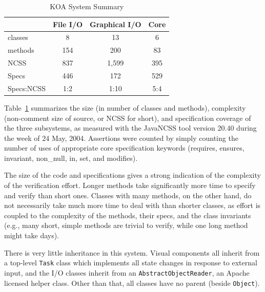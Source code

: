 \documentclass{llncs}
\begin{document}
\begin{table}[htbp]
  \caption{KOA System Summary}
  \label{tab:KOA_System_Summary}
  \begin{center}
    \begin{tabular}{|l|ccc|}
      \hline
      \quad     & \textbf{File I/O} & \textbf{Graphical I/O} & \textbf{Core} \\
      \hline
       classes & 8                 & 13                     & 6             \\
       methods & 154               & 200                    & 83            \\
      NCSS      & 837               & 1,599                  & 395           \\
      Specs     & 446               & 172                    & 529           \\
      Specs:NCSS & 1:2              & 1:10                   & 5:4           \\
      \hline
    \end{tabular}
  \end{center}
\end{table}


Table~\ref{tab:KOA_System_Summary} summarizes the size (in
number of classes and methods), complexity (non-comment size of
source, or NCSS for short), and specification coverage of the three
subsystems, as measured with the JavaNCSS tool version 20.40 during
the week of 24 May, 2004.  Assertions were counted by simply counting
the number of uses of appropriate core specification keywords
(requires, ensures, invariant, non\_null, in, set, and modifies).

The size of the code and specifications gives a strong indication of
the complexity of the verification effort.  Longer methods take
significantly more time to specify and verify than short ones.
Classes with many methods, on the other hand, do not necessarily take
much more time to deal with than shorter classes, as effort is coupled
to the complexity of the methods, their specs, and the class
invariants (e.g., many short, simple methods are trivial to verify,
while one long method might take days).

There is very little inheritance in this system.  Visual components
all inherit from a top-level \texttt{Task} class which implements all
state changes in response to external input, and the I/O classes
inherit from an \texttt{AbstractObjectReader}, an Apache licensed
helper class.  Other than that, all classes have no parent (beside
\texttt{Object}).  
\end{document}
